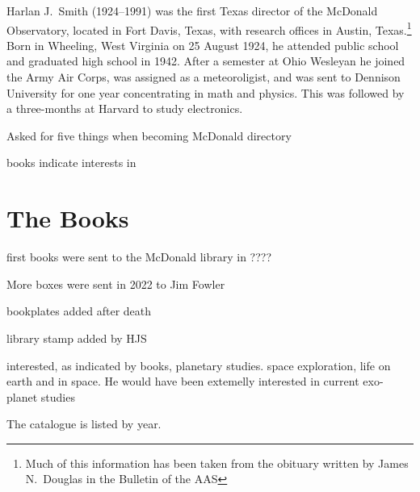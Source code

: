 

Harlan J.~Smith (1924--1991) was the first Texas director of the
McDonald Observatory, located in Fort Davis, Texas, with research
offices in Austin, Texas.\footnote{Much of this information has been
taken from the obituary written by James N.~Douglas in the Bulletin of
the AAS} Born in Wheeling, West Virginia on 25 August
1924, he attended public school and graduated high school in 1942. After
a semester at Ohio Wesleyan he joined the Army Air Corps, was assigned
as a meteoroligist, and was sent to Dennison University for one year
concentrating in math and physics. This was followed by a three-months
at Harvard to study electronics.

Asked for five things when becoming McDonald directory

books indicate interests in

\section*{The Books}

first books were sent to the McDonald library in ????

More boxes were sent in 2022 to Jim Fowler

bookplates added after death

library stamp added by HJS

interested, as indicated by books, planetary studies. space
exploration, life on earth and in space. He would have been extemelly
interested in current exo-planet studies

The catalogue is listed by year.
